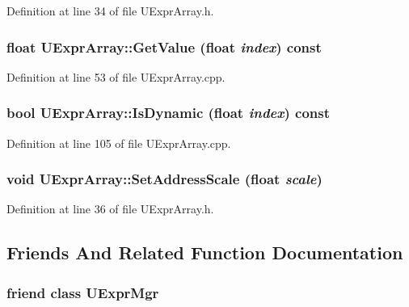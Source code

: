 Definition at line 34 of file UExprArray.h.\hypertarget{class_u_expr_array_6d9d46d67eb7dcb043032e944e67c5e2}{
\subsubsection[{GetValue}]{\setlength{\rightskip}{0pt plus 5cm}float UExprArray::GetValue (float {\em index}) const}}
\label{class_u_expr_array_6d9d46d67eb7dcb043032e944e67c5e2}




Definition at line 53 of file UExprArray.cpp.\hypertarget{class_u_expr_array_6c44f1bdc753091ee7a33f653723a78d}{
\subsubsection[{IsDynamic}]{\setlength{\rightskip}{0pt plus 5cm}bool UExprArray::IsDynamic (float {\em index}) const}}
\label{class_u_expr_array_6c44f1bdc753091ee7a33f653723a78d}




Definition at line 105 of file UExprArray.cpp.\hypertarget{class_u_expr_array_5146bc80ce998498094442d2323e66aa}{
\subsubsection[{SetAddressScale}]{\setlength{\rightskip}{0pt plus 5cm}void UExprArray::SetAddressScale (float {\em scale})}}
\label{class_u_expr_array_5146bc80ce998498094442d2323e66aa}




Definition at line 36 of file UExprArray.h.

\subsection{Friends And Related Function Documentation}
\hypertarget{class_u_expr_array_aba1a84b84f2ff7cab4b76539215bd34}{
\subsubsection[{UExprMgr}]{\setlength{\rightskip}{0pt plus 5cm}friend class {\bf UExprMgr}}}
\label{class_u_expr_array_aba1a84b84f2ff7cab4b76539215bd34}




